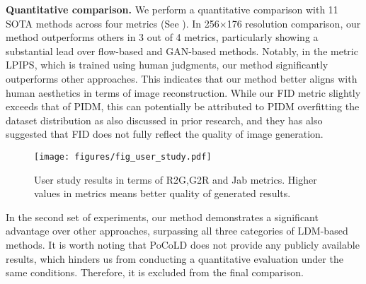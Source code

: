 \textbf{Quantitative comparison.}
We perform a quantitative comparison with 11 SOTA methods across four metrics (See ). In 256$\times$176 resolution comparison, our method outperforms others in 3 out of 4 metrics, particularly showing a substantial lead over flow-based and GAN-based methods. Notably, in the metric LPIPS, which is trained using human judgments, our method significantly outperforms other approaches. This indicates that our method better aligns with human aesthetics in terms of image reconstruction. While our FID metric slightly exceeds that of PIDM, this can potentially be attributed to PIDM overfitting the dataset distribution as also discussed in prior research\cite{shen2024advancing,lu2024coarse,han2023controllable}, and they has also suggested that FID does not fully reflect the quality of image generation.
%
\begin{figure}{}{}
    \texttt{[image: figures/fig\_user\_study.pdf]}
    \caption{{\color{black}User study results in terms of R2G,G2R and Jab metrics. Higher values in metrics means better quality of generated results.}
    \label{user study}
    }
    \label{fig:problem}
\end{figure}
%
In the second set of experiments, our method demonstrates a significant advantage over other approaches, surpassing all three categories of LDM-based methods. It is worth noting that PoCoLD\cite{han2023controllable} does not provide any publicly available results, which hinders us from conducting a quantitative evaluation under the same conditions.
Therefore, it is excluded from the final comparison. 

